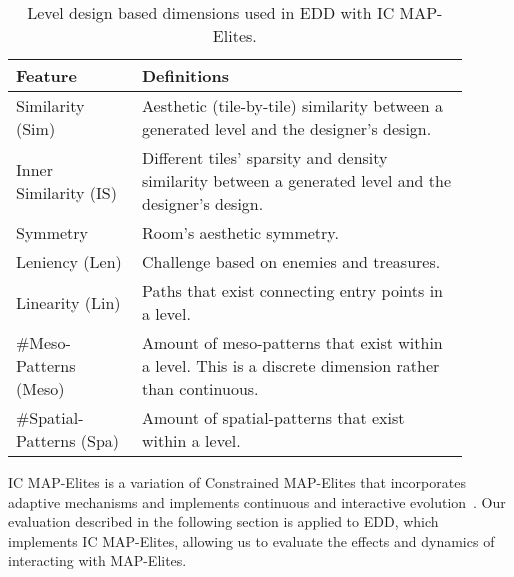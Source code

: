 \begin{table}[]
\begin{tabular}{p{0.25\linewidth}| p{0.65\linewidth}}
Feature          & Definitions                                                                                                                  \\ \hline
Similarity (Sim)       & Aesthetic (tile-by-tile) similarity between a generated level and the designer's design.                         \\ \hline
Inner Similarity (IS) & Different tiles' sparsity and density similarity between a generated level and the designer's design.     \\ \hline
Symmetry         & Room's aesthetic symmetry.                                                                                 \\ \hline
Leniency (Len)        & Challenge based on enemies and treasures.\\ \hline
Linearity (Lin)       & Paths that exist connecting entry points in a level.  \\ \hline
\#Meso-Patterns (Meso) & Amount of meso-patterns that exist within a level. This is a discrete dimension rather than continuous.\\ \hline
\#Spatial-Patterns (Spa) & Amount of spatial-patterns that exist within a level. \\ \hline
\end{tabular}
\caption{Level design based dimensions used in EDD with IC MAP-Elites.}
\label{tab:dimensions}
\end{table}

IC MAP-Elites is a variation of Constrained MAP-Elites that incorporates adaptive mechanisms and implements continuous and interactive evolution~. Our evaluation described in the following section is applied to EDD, which implements IC MAP-Elites, allowing us to evaluate the effects and dynamics of interacting with MAP-Elites. 



